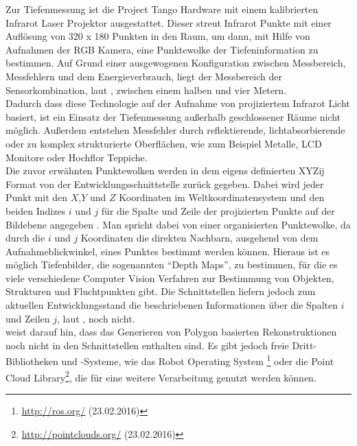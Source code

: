 Zur Tiefenmessung ist die Project Tango Hardware mit einem kalibrierten Infrarot Laser Projektor ausgestattet. Dieser streut Infrarot Punkte mit einer Auflösung von 320 x 180 Punkten in den Raum, um dann, mit Hilfe von Aufnahmen der RGB Kamera, eine Punktewolke der Tiefeninformation zu bestimmen. Auf Grund einer ausgewogenen Konfiguration zwischen Messbereich, Messfehlern und dem Energieverbrauch, liegt der Messbereich der Sensorkombination, laut \citet{GoogleDevelopersConcepts:online}, zwischen einem halben und vier Metern. \\

Dadurch dass diese Technologie auf der Aufnahme von projiziertem Infrarot Licht basiert, ist ein Einsatz der Tiefenmessung außerhalb geschlossener Räume nicht möglich. \citep{GoogleDevelopersConcepts:online} Außerdem entstehen Messfehler durch reflektierende,  lichtabsorbierende oder zu komplex strukturierte Oberflächen, wie zum Beispiel Metalle, LCD Monitore oder Hochflor Teppiche. \\

Die zuvor erwähnten Punktewolken werden in dem eigens definierten XYZij Format von der Entwicklungsschnittstelle zurück gegeben. Dabei wird jeder Punkt mit den \(X\),\(Y\) und \(Z\) Koordinaten im Weltkoordinatensystem und den beiden Indizes \(i \) und \(j \) für die Spalte und Zeile der projizierten Punkte auf der Bildebene angegeben \citep{GoogleDevelopersConcepts:online}. Man spricht dabei von einer organisierten Punktewolke, da durch die \(i\) und \(j\) Koordinaten die direkten Nachbarn, ausgehend von dem Aufnahmeblickwinkel, eines Punktes bestimmt werden können. Hieraus ist es möglich Tiefenbilder, die sogenannten \enquote{Depth Maps}, zu bestimmen, für die es viele verschiedene Computer Vision Verfahren zur Bestimmung von Objekten, Strukturen und Fluchtpunkten gibt. Die Schnittstellen liefern jedoch zum aktuellen Entwicklungsstand die beschriebenen Informationen über die Spalten \(i\) und Zeilen \(j\), laut \citet{GoogleDevelopersKnownIssues:online}, noch nicht.\\

\citet{GoogleDevelopersConcepts:online} weist darauf hin, dass das Generieren von Polygon basierten Rekonstruktionen noch nicht in den Schnittstellen enthalten sind. Es gibt jedoch freie Dritt-Bibliotheken und -Systeme, wie das Robot Operating System \footnote{\url{http://ros.org/} (23.02.2016)} oder die Point Cloud Library\footnote{\url{http://pointclouds.org/} (23.02.2016)}, die für eine weitere Verarbeitung genutzt werden können.

